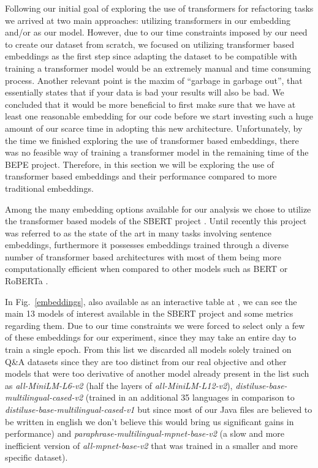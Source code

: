 Following our initial goal of exploring the use of transformers for refactoring tasks we arrived at two main approaches: utilizing transformers in our embedding and/or as our model. However, due to our time constraints imposed by our need to create our dataset from scratch, we focused on utilizing transformer based embeddings as the first step since adapting the dataset to be compatible with training a transformer model would be an extremely manual and time consuming process. Another relevant point is the maxim of ``garbage in garbage out'', that essentially states that if your data is bad your results will also be bad. We concluded that it would be more beneficial to first make sure that we have at least one reasonable embedding for our code before we start investing such a huge amount of our scarce time in adopting this new architecture. Unfortunately, by the time we finished exploring the use of transformer based embeddings, there was no feasible way of training a transformer model in the remaining time of the BEPE project. Therefore, in this section we will be exploring the use of transformer based embeddings and their performance compared to more traditional embeddings.


Among the many embedding options available for our analysis we chose to utilize the transformer based models of the SBERT project \citep{sbert_paper}. Until recently this project was referred to as the state of the art in many tasks involving sentence embeddings, furthermore it possesses embeddings trained through a diverse number of transformer based architectures with most of them being more computationally efficient when compared to other models such as BERT \citep{BERT} or RoBERTa \citep{roberta}.



In Fig.~\ref{embeddings}, also available as an interactive table at \citet{link_sbert_tabela}, we can see the main 13 models of interest available in the SBERT project and some metrics regarding them. Due to our time constraints we were forced to select only a few of these embeddings for our experiment, since they may take an entire day to train a single epoch. From this list we discarded all models solely trained on Q\&A datasets since they are too distinct from our real objective and other models that were too derivative of another model already present in the list such as \textit{all-MiniLM-L6-v2} (half the layers of \textit{all-MiniLM-L12-v2}), \textit{distiluse-base-multilingual-cased-v2} (trained in an additional 35 languages in comparison to \textit{distiluse-base-multilingual-cased-v1} but since most of our Java files are believed to be written in english we don't believe this would bring us significant gains in performance) and \textit{paraphrase-multilingual-mpnet-base-v2} (a slow and more inefficient version of \textit{all-mpnet-base-v2} that was trained in a smaller and more specific dataset). 


